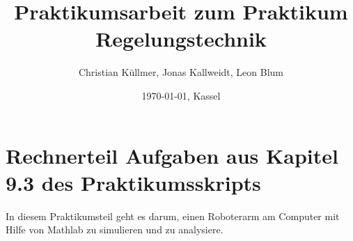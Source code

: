 \documentclass[10pt]{scrartcl}
\begin{document}










\title{Praktikumsarbeit zum Praktikum Regelungstechnik}
\author{Christian Küllmer, Jonas Kallweidt, Leon Blum}
\date{\today{}, Kassel}
\maketitle
\newpage
\renewcommand{\contentsname}{Inhaltsverzeichnis}
\tableofcontents
\newpage
\listoffigures
\newpage




\section{Rechnerteil Aufgaben aus Kapitel 9.3 des Praktikumsskripts}
In diesem Praktikumsteil geht es darum, einen Roboterarm am Computer mit Hilfe von Mathlab zu simulieren und zu analysiere. 
\end{document}
